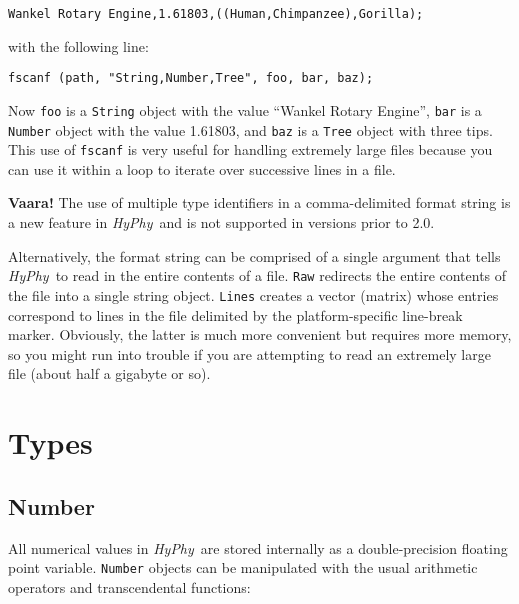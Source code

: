 \documentclass[12pt]{book}
\newcommand{\hyphy}{\textit{HyPhy}}
\begin{document}
\begin{verbatim}
Wankel Rotary Engine,1.61803,((Human,Chimpanzee),Gorilla);
\end{verbatim}

\noindent with the following line:

\begin{leftbar}
\begin{verbatim}
fscanf (path, "String,Number,Tree", foo, bar, baz);
\end{verbatim}
\end{leftbar}

\noindent Now {\tt foo} is a {\tt String} object with the value ``Wankel Rotary Engine'', {\tt bar} is a {\tt Number} object with the value 1.61803, and {\tt baz} is a {\tt Tree} object with three tips.  This use of {\tt fscanf} is very useful for handling extremely large files because you can use it within a loop to iterate over successive lines in a file.

\begin{framed}
\vspace*{-1ex}
\noindent
\textdbend\hspace{1ex}
\small
\textbf{Vaara!}  The use of multiple type identifiers in a comma-delimited format string is a new feature in \hyphy\ and is not supported in versions prior to 2.0.
\end{framed}

Alternatively, the format string can be comprised of a single argument that tells \hyphy\ to read in the entire contents of a file.  {\tt Raw} redirects the entire contents of the file into a single string object.  {\tt Lines} creates a vector (matrix) whose entries correspond to lines in the file delimited by the platform-specific line-break marker.  Obviously, the latter is much more convenient but requires more memory, so you might run into trouble if you are attempting to read an extremely large file (about half a gigabyte or so).



\section {Types}\label{types}

\subsection {Number}

All numerical values in \hyphy\ are stored internally as a double-precision floating point variable.  {\tt Number} objects can be manipulated with the usual arithmetic operators and transcendental functions:
\end{document}
